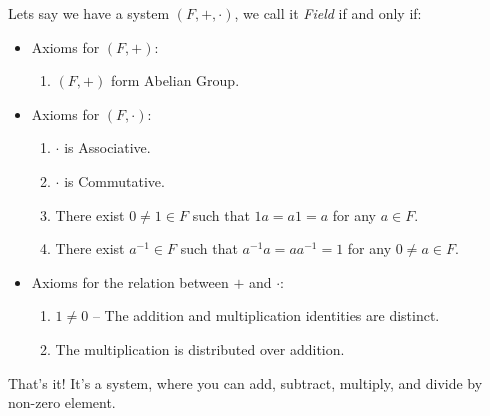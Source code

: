 Lets say we have a system $(F,+,\cdot)$, we call it {\it Field} if and only if:
\begin{itemize}
    \item Axioms for $(F,+)$:
    \begin{enumerate}
        \item $(F,+)$ form Abelian Group.
    \end{enumerate}
    \item Axioms for $(F,\cdot)$:
    \begin{enumerate}
        \item $\cdot$ is Associative.
        \item $\cdot$ is Commutative.
        \item There exist $0 \neq 1 \in F$ such that $1a = a1 = a$ for any $a \in F$.
        \item There exist $a^{-1} \in F$ such that $a^{-1}a = aa^{-1} = 1$ for any $0 \neq a \in F$.
    \end{enumerate}
    \item Axioms for the relation between $+$ and $\cdot$:
    \begin{enumerate}
        \item $1 \neq 0$ -- The addition and multiplication identities are distinct.
        \item The multiplication is distributed over addition.
    \end{enumerate}
\end{itemize}
That's it! It's a system, where you can add, subtract, multiply, and divide by non-zero element.